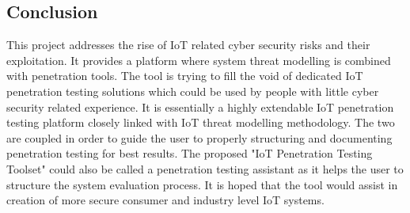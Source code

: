 	\subsection{Conclusion}
	This project addresses the rise of IoT related cyber security risks and their exploitation. It provides a platform where system threat modelling is combined with penetration tools. The tool is trying to fill the void of dedicated IoT penetration testing solutions which could be used by people with little cyber security related experience. It is essentially a highly extendable IoT penetration testing platform closely linked with IoT threat modelling methodology. The two are coupled in order to guide the user to properly structuring and documenting penetration testing for best results. The proposed "IoT Penetration Testing Toolset" could also be called a penetration testing assistant as it helps the user to structure the system evaluation process. It is hoped that the tool would assist in creation of more secure consumer and industry level IoT systems.

